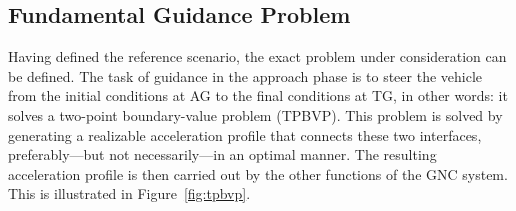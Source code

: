 \documentclass[%
]{aiaa-tc}
\begin{document}
\subsection{Fundamental Guidance Problem}


Having defined the reference scenario, the exact problem under consideration can
be defined. The task of guidance in the approach phase is to steer the vehicle
from the initial conditions at AG to the final conditions at TG, in other words:
it solves a two-point boundary-value problem (TPBVP). This problem is solved by
generating a realizable acceleration profile that connects these two interfaces,
preferably---but not necessarily---in an optimal manner. The resulting
acceleration profile is then carried out by the other functions of the GNC
system. This is illustrated in Figure~\ref{fig:tpbvp}.
\end{document}
